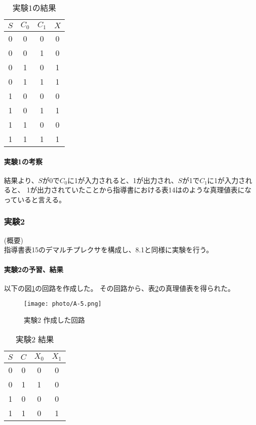 \documentclass[dvipdfmx]{jsarticle}
\begin{document}
\begin{table}[hbtp]
  \centering
  \caption{実験1の結果}
  \begin{tabular}{|c|c|c||c|} \hline
    $S$ & $C_0$ & $C_1$ & $X$ \\ \hline\hline
    0 & 0 & 0 & 0 \\ \hline
    0 & 0 & 1 & 0 \\ \hline
    0 & 1 & 0 & 1 \\ \hline
    0 & 1 & 1 & 1 \\ \hline
    1 & 0 & 0 & 0 \\ \hline
    1 & 0 & 1 & 1 \\ \hline
    1 & 1 & 0 & 0 \\ \hline
    1 & 1 & 1 & 1 \\ \hline
  \end{tabular}
  \label{tb:A-7}
\end{table}

\paragraph*{実験1の考察}
結果より、$S$が0で$C_0$に1が入力されると、1が出力され、$S$が1で$C_1$に1が入力されると、
1が出力されていたことから指導書\cite{degital}における表14はのような真理値表になっていると言える。

\subsubsection{実験2}
(概要)\\
指導書\cite[p.3-12]{degital}表15のデマルチプレクサを構成し、8.1と同様に実験を行う。
\paragraph*{実験2の予習、結果}
以下の図\ref*{fig:A-5}の回路を作成した。
その回路から、表\ref*{tb:A-8}の真理値表を得られた。
\begin{figure}[hbtp]
  \begin{center}
    \texttt{[image: photo/A-5.png]}
  \end{center}
  \caption{実験2 作成した回路}
  \label{fig:A-5}
\end{figure}

\begin{table}[hbtp]
  \centering
  \caption{実験2 結果}
  \begin{tabular}{|c|c||c|c|}\hline
    $S$ & $C$ & $X_0$ & $X_1$ \\ \hline\hline
    0 & 0 & 0 & 0 \\ \hline
    0 & 1 & 1 & 0 \\ \hline
    1 & 0 & 0 & 0 \\ \hline
    1 & 1 & 0 & 1 \\ \hline
  \end{tabular}
  \label{tb:A-8}
\end{table}
\end{document}
